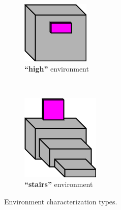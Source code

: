 \documentclass[journal]{IEEEtran}
\begin{document}
\begin{figure}[t]
    \begin{subfigure}[t]{0.15\textwidth}
        \includegraphics[width=\textwidth]{images/HighFreeEnvironment.png}
        \caption{\textbf{``high''} environment}
    \end{subfigure} \ \ \ \ \ \
    \begin{subfigure}[t]{0.15\textwidth}
        \includegraphics[width=\textwidth]{images/LedgeEnvironment.png}
        \caption{\textbf{``stairs''} environment}
    \end{subfigure}
      \caption{Environment characterization types.}
      \label{fig:characters}
\end{figure}
\end{document}
